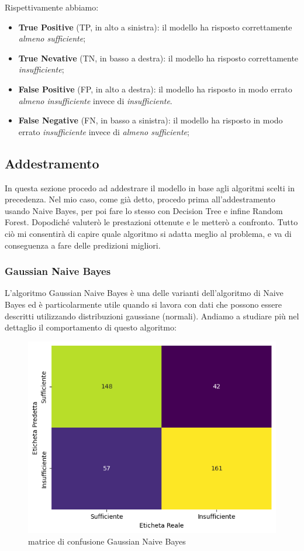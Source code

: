 \documentclass{article}
\begin{document}
\begin{titlepage}
        Rispettivamente abbiamo: 
         \begin{itemize}
            \item \textbf{True Positive} (TP, in alto a sinistra): il modello ha risposto correttamente \textit{almeno sufficiente};
            \item \textbf{True Nevative} (TN, in basso a destra): il modello ha risposto correttamente \textit{insufficiente};
            \item \textbf{False Positive} (FP, in alto a destra): il modello ha risposto in modo errato \textit{almeno insufficiente} invece di \textit{insufficiente}.
            \item \textbf{False Negative} (FN, in basso a sinistra):
            il modello ha risposto in modo errato \textit{insufficiente} invece di \textit{almeno sufficiente};
            
        \end{itemize}

         
        \subsection{Addestramento}
         In questa sezione procedo ad addestrare il modello in base agli algoritmi scelti in precedenza. Nel mio caso, come già detto, procedo prima all’addestramento usando Naive Bayes, per poi fare lo stesso con Decision Tree e infine Random Forest. Dopodiché valuterò le
         prestazioni ottenute e le metterò a confronto. Tutto ciò mi consentirà di capire quale algoritmo si adatta meglio al problema, e va di conseguenza a fare delle predizioni migliori.
        
        \newpage
        \subsubsection{Gaussian Naive Bayes}
         L'algoritmo Gaussian Naive Bayes è una delle varianti dell'algoritmo di Naive Bayes ed è particolarmente utile quando si lavora con dati che possono essere descritti utilizzando distribuzioni gaussiane (normali). Andiamo a studiare più nel dettaglio il comportamento di questo algoritmo:

         \begin{figure}[ht]
            \centering
            \includegraphics[width=0.6\linewidth]{confusion_matrix-GNB.png}
            \caption{  matrice di confusione Gaussian Naive Bayes}
            \label{fig:enter-label}
        \end{figure}
        

\end{titlepage}
\end{document}
